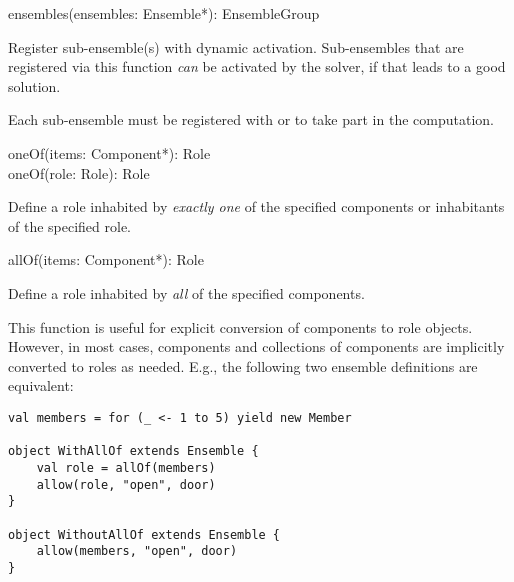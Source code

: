 \begin{dslsig}
ensembles(ensembles: Ensemble*): EnsembleGroup
\end{dslsig}
\begin{dsldesc}
    Register sub-ensemble(s) with dynamic activation. Sub-ensembles that are registered
    via this function \textit{can} be activated by the solver, if that leads to a good
    solution.

    Each sub-ensemble must be registered with  or  to take
    part in the computation.
\end{dsldesc}

\pagebreak
\begin{dslsig}
oneOf(items: Component*): Role \\
oneOf(role: Role): Role
\end{dslsig}
\begin{dsldesc}
    Define a role inhabited by \textit{exactly one} of the specified components or
    inhabitants of the specified role.
\end{dsldesc}

\begin{dslsig}
allOf(items: Component*): Role
\end{dslsig}
\begin{dsldesc}
    Define a role inhabited by \textit{all} of the specified components.

    This function is useful for explicit conversion of components to role objects.
    However, in most cases, components and collections of components are implicitly
    converted to roles as needed. E.g., the following two ensemble definitions are
    equivalent:
\begin{lstlisting}[style=ensembles]
val members = for (_ <- 1 to 5) yield new Member

object WithAllOf extends Ensemble {
    val role = allOf(members)
    allow(role, "open", door)
}

object WithoutAllOf extends Ensemble {
    allow(members, "open", door)
}
\end{lstlisting}
\end{dsldesc}

